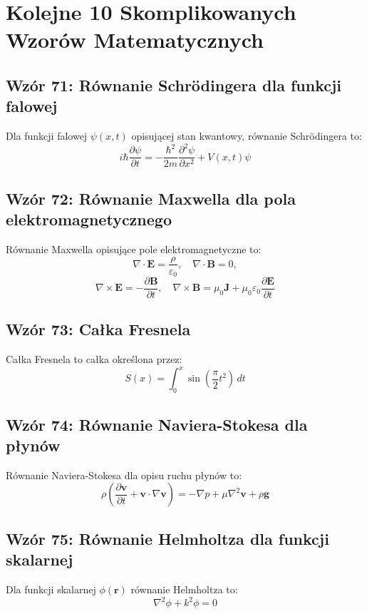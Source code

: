 \documentclass{article}
\begin{document}
\section*{Kolejne 10 Skomplikowanych Wzorów Matematycznych}

\subsection*{Wzór 71: Równanie Schrödingera dla funkcji falowej}

Dla funkcji falowej \(\psi(x, t)\) opisującej stan kwantowy, równanie Schrödingera to:
\[ i\hbar\frac{\partial \psi}{\partial t} = -\frac{\hbar^2}{2m}\frac{\partial^2 \psi}{\partial x^2} + V(x,t)\psi \]

\subsection*{Wzór 72: Równanie Maxwella dla pola elektromagnetycznego}

Równanie Maxwella opisujące pole elektromagnetyczne to:
\[ \nabla \cdot \mathbf{E} = \frac{\rho}{\varepsilon_0}, \quad \nabla \cdot \mathbf{B} = 0, \]
\[ \nabla \times \mathbf{E} = -\frac{\partial \mathbf{B}}{\partial t}, \quad \nabla \times \mathbf{B} = \mu_0\mathbf{J} + \mu_0\varepsilon_0\frac{\partial \mathbf{E}}{\partial t} \]

\subsection*{Wzór 73: Całka Fresnela}

Całka Fresnela to całka określona przez:
\[ S(x) = \int_{0}^{x} \sin\left(\frac{\pi}{2}t^2\right) \, dt \]

\subsection*{Wzór 74: Równanie Naviera-Stokesa dla płynów}

Równanie Naviera-Stokesa dla opisu ruchu płynów to:
\[ \rho\left(\frac{\partial \mathbf{v}}{\partial t} + \mathbf{v} \cdot \nabla \mathbf{v}\right) = -\nabla p + \mu\nabla^2 \mathbf{v} + \rho\mathbf{g} \]

\subsection*{Wzór 75: Równanie Helmholtza dla funkcji skalarnej}

Dla funkcji skalarnej \(\phi(\mathbf{r})\) równanie Helmholtza to:
\[ \nabla^2 \phi + k^2\phi = 0 \]
\end{document}

